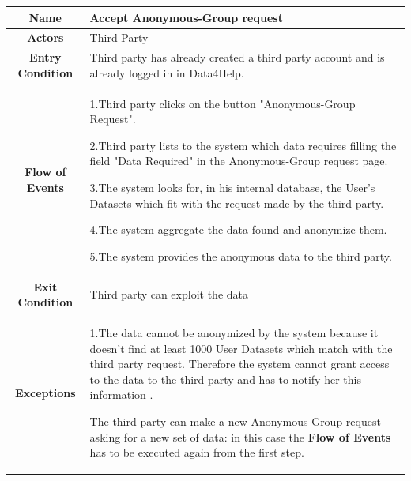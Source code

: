       \begin{table}[h!]
        \centering
        \begin{tabularx}{\linewidth}{|c|X|}
          \hline
          \textbf{Name} & Accept Anonymous-Group request\\
        	\hline
        	\textbf{Actors} & Third Party\\
        	\hline
        	\textbf{Entry Condition} & Third party has already created a third party account and is already logged in in Data4Help.\\
        	\hline
        	\textbf{Flow of Events} &
        					1.Third party clicks on the button "Anonymous-Group Request".

        					2.Third party lists to the system which data requires filling the field "Data Required" in the 							Anonymous-Group request page.

        					3.The system looks for, in his internal database, the User's Datasets  which fit with the request 						made by the third party.

        					4.The system aggregate the data found and anonymize them.

        					5.The system provides the anonymous data to the third party.\\
        	\hline
        	\textbf{Exit Condition} & Third party can exploit the data \\

        	\hline
        	\textbf{Exceptions} & 1.The data cannot be anonymized  by the system because it doesn't find at least 1000 							User Datasets which match with the third party request. Therefore the system cannot 							grant access to the data to the third party and has to notify her this information .

        						The third party can make a new Anonymous-Group request asking for a new set of data: 							in this case the \textbf{Flow of Events} has to be executed again from the first step.\\

          \hline
        \end{tabularx}
      \end{table}





